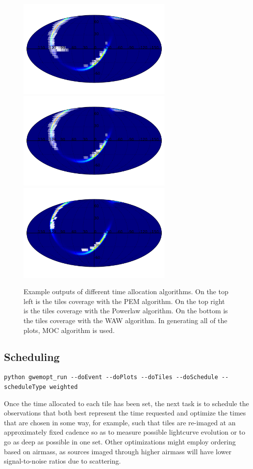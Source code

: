 \documentclass[twocolumn]{aastex61}
\begin{document}
\begin{figure}
    \centering
    \includegraphics[width=3in]{plots/coverage_pem.pdf}
    \includegraphics[width=3in]{plots/coverage_powerlaw.pdf}
    \includegraphics[width=3in]{plots/coverage_waw.pdf}
    \caption{Example outputs of different time allocation algorithms. On the top left is the tiles coverage with the PEM algorithm. On the top right is the tiles coverage with the Powerlaw algorithm. On the bottom is the tiles coverage with the WAW algorithm. In generating all of the plots, MOC algorithm is used.}
    \label{fig:timealloc}
\end{figure}


\subsection{Scheduling}
\begin{lstlisting}
python gwemopt_run --doEvent --doPlots --doTiles --doSchedule --scheduleType weighted
\end{lstlisting}
Once the time allocated to each tile has been set, the next task is to schedule the observations that both best represent the time requested and optimize the times that are chosen in some way, for example, such that tiles are re-imaged at an approximately fixed cadence so as to measure possible lightcurve evolution or to go as deep as possible in one set.
Other optimizations might employ ordering based on airmass, as sources imaged through higher airmass will have lower signal-to-noise ratios due to scattering.
\end{document}
